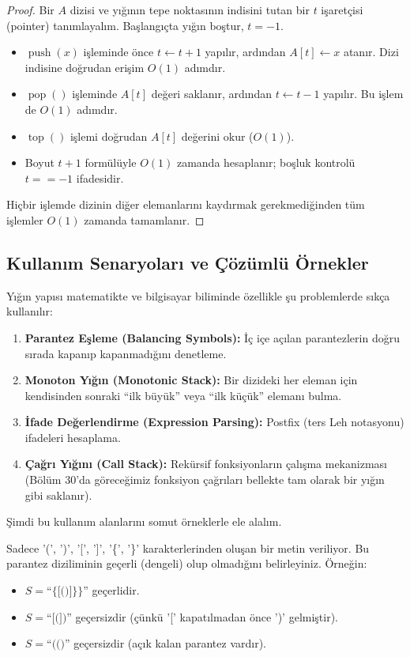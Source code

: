 \begin{proof}
Bir $A$ dizisi ve yığının tepe noktasının indisini tutan bir $t$ işaretçisi (pointer) tanımlayalım. Başlangıçta yığın boştur, $t = -1$.
\begin{itemize}
    \item $\operatorname{push}(x)$ işleminde önce $t \leftarrow t + 1$ yapılır, ardından $A[t] \leftarrow x$ atanır. Dizi indisine doğrudan erişim $O(1)$ adımdır.
    \item $\operatorname{pop}()$ işleminde $A[t]$ değeri saklanır, ardından $t \leftarrow t - 1$ yapılır. Bu işlem de $O(1)$ adımdır.
    \item $\operatorname{top}()$ işlemi doğrudan $A[t]$ değerini okur ($O(1)$).
    \item Boyut $t + 1$ formülüyle $O(1)$ zamanda hesaplanır; boşluk kontrolü $t == -1$ ifadesidir.
\end{itemize}
Hiçbir işlemde dizinin diğer elemanlarını kaydırmak gerekmediğinden tüm işlemler $O(1)$ zamanda tamamlanır.
\end{proof}

\subsection{Kullanım Senaryoları ve Çözümlü Örnekler}

Yığın yapısı matematikte ve bilgisayar biliminde özellikle şu problemlerde sıkça kullanılır:
\begin{enumerate}
    \item \textbf{Parantez Eşleme (Balancing Symbols):} İç içe açılan parantezlerin doğru sırada kapanıp kapanmadığını denetleme.
    \item \textbf{Monoton Yığın (Monotonic Stack):} Bir dizideki her eleman için kendisinden sonraki ``ilk büyük'' veya ``ilk küçük'' elemanı bulma.
    \item \textbf{İfade Değerlendirme (Expression Parsing):} Postfix (ters Leh notasyonu) ifadeleri hesaplama.
    \item \textbf{Çağrı Yığını (Call Stack):} Rekürsif fonksiyonların çalışma mekanizması (Bölüm 30'da göreceğimiz fonksiyon çağrıları bellekte tam olarak bir yığın gibi saklanır).
\end{enumerate}

Şimdi bu kullanım alanlarını somut örneklerle ele alalım.

\begin{example}
Sadece '(', ')', '[', ']', '\{', '\}' karakterlerinden oluşan bir metin veriliyor. Bu parantez diziliminin geçerli (dengeli) olup olmadığını belirleyiniz. Örneğin:
\begin{itemize}
    \item $S = \text{``\{[()]\}\}''}$ geçerlidir.
    \item $S = \text{``[(])''}$ geçersizdir (çünkü '[' kapatılmadan önce ')' gelmiştir).
    \item $S = \text{``(()''}$ geçersizdir (açık kalan parantez vardır).
\end{itemize}
\end{example}

